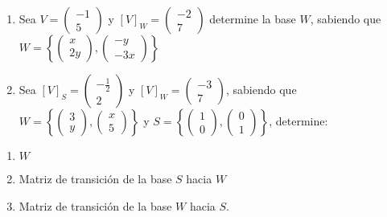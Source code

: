 \documentclass[
  11,
]{article}
\providecommand{\tightlist}{%
  \setlength{\itemsep}{0pt}\setlength{\parskip}{0pt}}
\begin{document}
\begin{enumerate}
\def\labelenumi{\arabic{enumi}.}
\setcounter{enumi}{6}
\item
  Sea \(V = \begin{pmatrix}-1\\5\end{pmatrix}\) y
  \([V]_W = \begin{pmatrix}-2\\7\end{pmatrix}\) determine la base \(W\),
  sabiendo que
  \(W = \left\{ \begin{pmatrix}x\\2y\end{pmatrix}, \begin{pmatrix}-y\\-3x\end{pmatrix} \right\}\)
\item
  Sea \([V]_S = \begin{pmatrix}-\frac{1}{2}\\2\end{pmatrix}\) y
  \([V]_W = \begin{pmatrix}-3\\7\end{pmatrix}\), sabiendo que
  \(W = \left\{ \begin{pmatrix}3\\y\end{pmatrix}, \begin{pmatrix}x\\5\end{pmatrix} \right\}\)
  y
  \(S = \left\{ \begin{pmatrix}1\\0\end{pmatrix}, \begin{pmatrix}0\\1\end{pmatrix} \right\}\),
  determine:
\end{enumerate}

\begin{enumerate}
\def\labelenumi{\alph{enumi})}
\tightlist
\item
  \(W\)
\item
  Matriz de transición de la base \(S\) hacia \(W\)
\item
  Matriz de transición de la base \(W\) hacia \(S\).
\end{enumerate}
\end{document}
